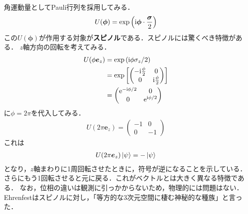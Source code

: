 \documentclass{report}
\begin{document}
角運動量としてPauli行列を採用してみる．
\begin{align}
  U(\bm{\phi}) = \exp\qty(\mathrm{i}\bm{\phi}\cdot\frac{\bm{\sigma}}{2})
\end{align}
この$U(\bm{\phi})$が作用する対象が\textbf{スピノル}である．スピノルには驚くべき特徴がある．
$z$軸方向の回転を考えてみる．
\begin{align}
  U(\phi\bm{e}_z) &= \exp\qty(\mathrm{i}\phi\sigma_z /2)\\
  &= \exp\qty[
    \begin{pmatrix}
      -\mathrm{i}\frac{\phi}{2} & 0\\
      0 & \mathrm{i}\frac{\phi}{2}
    \end{pmatrix}
  ]\\
  &=
  \begin{pmatrix}
    \mathrm{e}^{-\mathrm{i}\phi/2} & 0\\
    0 & \mathrm{e}^{\mathrm{i}\phi/2}
  \end{pmatrix}
\end{align}
に$\phi = 2\pi$を代入してみる．
\begin{align}
  U(2\pi\bm{e}_z) =
  \begin{pmatrix}
    -1 & 0\\
    0 & -1
  \end{pmatrix}
\end{align}
これは
\begin{align}
  U(2\pi\bm{e}_z)\ket{\psi} = -\ket{\psi}
\end{align}
となり，$z$軸まわりに1周回転させたときに，符号が逆になることを示している．さらにもう1回転させると元に戻る．これがベクトルとは大きく異なる特徴である．
なお，位相の違いは観測に引っかからないため，物理的には問題はない．Ehrenfestはスピノルに対し，「等方的な3次元空間に棲む神秘的な種族」と言った．
\end{document}
